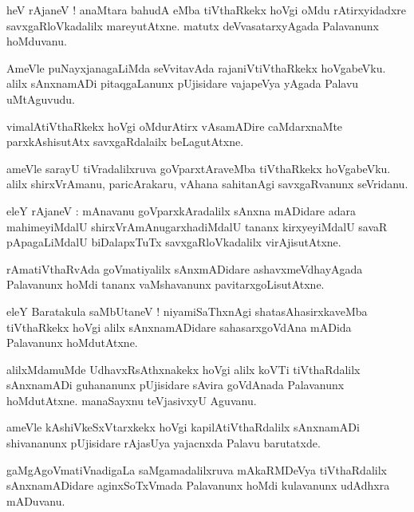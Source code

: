 \documentclass{article}
\begin{document}
\begin{mn}
heV rAjaneV ! anaMtara bahudA eMba tiVthaRkekx hoVgi oMdu rAtirxyidadxre savxgaRloVkadalilx 
mareyutAtxne. matutx deVvasatarxyAgada Palavanunx hoMduvanu.
\end{mn}

\begin{mn}
AmeVle puNayxjanagaLiMda seVvitavAda rajaniVtiVthaRkekx hoVgabeVku. alilx sAnxnamADi 
pitaqgaLanunx pUjisidare vajapeVya yAgada Palavu uMtAguvudu.
\end{mn}

\begin{mn}
vimalAtiVthaRkekx hoVgi oMdurAtirx vAsamADire  caMdarxnaMte parxkAshisutAtx savxgaRdalailx 
beLagutAtxne. 
\end{mn}

\begin{mn}
ameVle sarayU tiVradalilxruva goVparxtAraveMba tiVthaRkekx hoVgabeVku. alilx shirxVrAmanu, 
paricArakaru, vAhana sahitanAgi savxgaRvanunx seVridanu.
\end{mn}

\begin{mn}
eleY rAjaneV : mAnavanu goVparxkAradalilx sAnxna mADidare adara mahimeyiMdalU 
shirxVrAmAnugarxhadiMdalU tananx kirxyeyiMdalU savaR pApagaLiMdalU biDalapxTuTx savxgaRloVkadalilx 
virAjisutAtxne.
\end{mn}

\begin{mn}
rAmatiVthaRvAda goVmatiyalilx sAnxmADidare ashavxmeVdhayAgada Palavanunx hoMdi tananx 
vaMshavanunx pavitarxgoLisutAtxne.
\end{mn}

\begin{mn}
eleY Baratakula saMbUtaneV ! niyamiSaThxnAgi shatasAhasirxkaveMba tiVthaRkekx hoVgi alilx 
sAnxnamADidare sahasarxgoVdAna mADida Palavanunx hoMdutAtxne.
\end{mn}

\begin{mn}
alilxMdamuMde UdhavxRsAthxnakekx hoVgi alilx koVTi tiVthaRdalilx sAnxnamADi guhananunx pUjisidare 
sAvira goVdAnada Palavanunx hoMdutAtxne. manaSayxnu teVjasivxyU Aguvanu.
\end{mn}

\begin{mn}
ameVle kAshiVkeSxVtarxkekx hoVgi kapilAtiVthaRdalilx sAnxnamADi shivananunx pUjisidare rAjasUya 
yajacnxda Palavu barutatxde.
\end{mn}

\begin{mn}
gaMgAgoVmatiVnadigaLa saMgamadalilxruva mAkaRMDeVya tiVthaRdalilx sAnxnamADidare aginxSoTxVmada 
Palavanunx hoMdi kulavanunx udAdhxra mADuvanu.
\end{mn}
\end{document}
